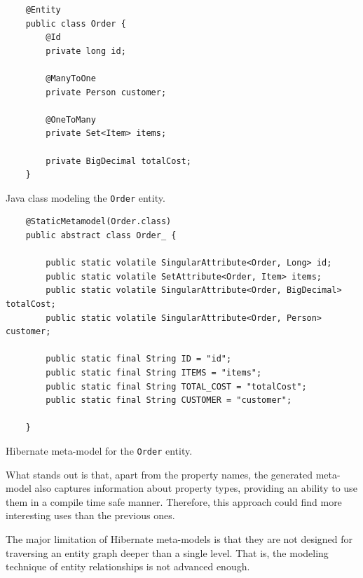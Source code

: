 \begin{listing}[H]
    \begin{verbatim}
    @Entity
    public class Order {
        @Id
        private long id;

        @ManyToOne
        private Person customer;

        @OneToMany
        private Set<Item> items;

        private BigDecimal totalCost;
    }
    \end{verbatim}
    \caption{Java class modeling the \texttt{Order} entity.}\label{lst:hibernate1}
\end{listing}

\begin{listing}[H]
    \begin{verbatim}
    @StaticMetamodel(Order.class)
    public abstract class Order_ {

        public static volatile SingularAttribute<Order, Long> id;
        public static volatile SetAttribute<Order, Item> items;
        public static volatile SingularAttribute<Order, BigDecimal> totalCost;
        public static volatile SingularAttribute<Order, Person> customer;

        public static final String ID = "id";
        public static final String ITEMS = "items";
        public static final String TOTAL_COST = "totalCost";
        public static final String CUSTOMER = "customer";

    }
    \end{verbatim}
    \caption{Hibernate meta-model for the \texttt{Order} entity.}\label{lst:hibernate2}
\end{listing}

What stands out is that, apart from the property names, the generated meta-model also captures information about property types, providing an ability to use them in a compile time safe manner.
Therefore, this approach could find more interesting uses than the previous ones.

\n

The major limitation of Hibernate meta-models is that they are not designed for traversing an entity graph deeper than a single level. That is, the modeling technique of entity relationships is not advanced enough.
